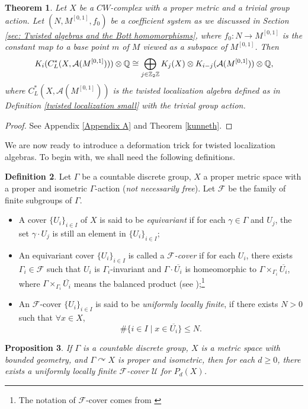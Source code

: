 \documentclass[11pt]{article}
\theoremstyle{definition}
\newtheorem{Def}{Definition}[section]
\theoremstyle{plain}
\newtheorem{Thm}[Def]{Theorem}
\newtheorem{Pro}[Def]{Proposition}
\def\A{\mathcal A}\def\C{\mathcal C}\def\B{\mathcal B}\def\E{\mathcal E}\def\O{\mathcal O}\def\h{\mathfrak h}\def\K{\mathcal K}\def\F{\mathcal F}\def\P{\mathcal P}\def\L{\mathcal L}\def\R{\mathcal R}\def\Q{\mathcal Q}\def\H{\mathcal H}\def\S{\mathcal S}\def\N{\mathcal N}\def\U{\mathcal U}\def\V{\mathcal V}
\def\ox{\otimes}
\def\ox{\otimes}
\def\Ga{\Gamma}
\def\car{\curvearrowright}
\begin{document}
\begin{Thm}\label{Kunneth}
Let $X$ be a $CW$-complex with a proper metric and a \emph{trivial group action}. Let $(N,M^{[0,1]},f_0)$ be a coefficient system as we discussed in Section \ref{sec: Twisted algebras and the Bott homomorphisms}, where $f_0:N\to M^{[0,1]}$ is the constant map to a base point $m$ of $M$ viewed as a subspace of $M^{[0,1]}$. Then
$$K_i(C^*_L(X,\A(M^{[0,1]})))\ox\IQ\cong \bigoplus_{j\in\IZ_2\IZ}K_j(X)\ox K_{i-j}(\A(M^{[0,1]}))\ox\IQ,$$
where $C^*_L(X,\A(M^{[0,1]}))$ is the twisted localization algebra defined as in Definition \ref{twisted localization small} with the trivial group action.
\end{Thm}

\begin{proof}
See Appendix \ref{Appendix A} and Theorem \ref{kunneth}.
\end{proof}

We are now ready to introduce a deformation trick for twisted localization algebras. To begin with, we shall need the following definitions.

\begin{Def}\label{Def ulf cover}
Let $\Ga$ be a countable discrete group, $X$ a proper metric space with a proper and isometric $\Ga$-action (\emph{not necessarily free}). Let $\F$ be the family of finite subgroups of $\Ga$.
\begin{itemize}
\item[(1)]A cover $\{U_i\}_{i\in I}$ of $X$ is said to be \emph{equivariant} if for each $\gamma\in\Ga$ and $U_j$, the set $\gamma\cdot U_j$ is still an element in $\{U_i\}_{i\in I}$;
\item[(2)]An equivariant cover $\{U_i\}_{i\in I}$ is called a \emph{$\F$-cover} if for each $U_i$, there exists $\Ga_i\in\F$ such that $U_i$ is $\Ga_i$-invariant and $\Ga\cdot\overline{U_i}$ is homeomorphic to $\Ga\times_{\Ga_i}\overline{U_i}$, where $\Ga\times_{\Ga_i}\overline{U_i}$ means the balanced product (see \cite[Example A.2.6]{HIT2020});\footnote{The notation of $\F$-cover comes from \cite[Definition 1.1]{BLR2008}}
\item[(3)]An $\F$-cover $\{U_i\}_{i\in I}$ is said to be \emph{uniformly locally finite}, if there exists $N>0$ such that $\forall x\in X$,
$$\#\{i\in I\mid x\in\overline{U_i}\}\leq N.$$
\end{itemize}\end{Def}

\begin{Pro}\label{ulf cover}
If $\Ga$ is a countable discrete group, $X$ is a metric space with bounded geometry, and $\Ga\car X$ is proper and isometric, then for each $d\geq 0$, there exists a uniformly locally finite $\F$-cover $\U$ for $P_d(X)$.
\end{Pro}
\end{document}
